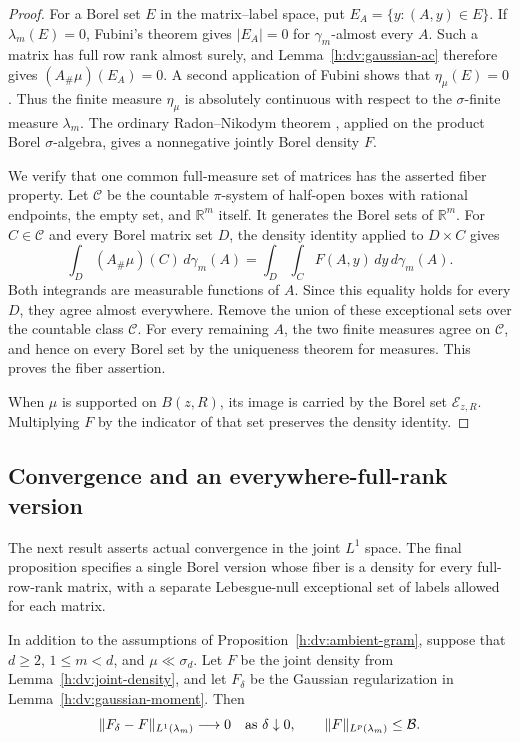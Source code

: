 \begin{proof}
For a Borel set \(E\) in the matrix--label space, put
\(E_A=\{y:(A,y)\in E\}\).  If \(\lambda_m(E)=0\), Fubini's theorem
gives \(|E_A|=0\) for \(\gamma_m\)-almost every \(A\).  Such a matrix
has full row rank almost surely, and Lemma~\ref{h:dv:gaussian-ac}
therefore gives \((A_\#\mu)(E_A)=0\).  A second application of Fubini
shows that \(\eta_\mu(E)=0\).  Thus the finite measure \(\eta_\mu\)
is absolutely continuous with respect to the \(\sigma\)-finite measure
\(\lambda_m\).  The ordinary Radon--Nikodym theorem
\cite[Theorem~6.27]{HunterMeasure2011}, applied on the product Borel
\(\sigma\)-algebra, gives a nonnegative jointly Borel density \(F\).

We verify that one common full-measure set of matrices has the asserted
fiber property.  Let \(\mathcal C\) be the countable \(\pi\)-system of
half-open boxes with rational endpoints, the empty set, and
\(\mathbb R^m\) itself.  It generates the Borel sets of
\(\mathbb R^m\).  For
\(C\in\mathcal C\) and every Borel matrix set \(D\), the density
identity applied to \(D\times C\) gives
\[
 \int_D(A_\#\mu)(C)\,d\gamma_m(A)
 =
 \int_D\int_C F(A,y)\,dy\,d\gamma_m(A).
\]
Both integrands are measurable functions of \(A\).  Since this equality
holds for every \(D\), they agree almost everywhere.  Remove the union
of these exceptional sets over the countable class \(\mathcal C\).
For every remaining \(A\), the two finite measures agree on
\(\mathcal C\), and hence on every Borel set by the uniqueness theorem
for measures.  This proves the fiber assertion.

When \(\mu\) is supported on \(B(z,R)\), its image is carried by
the Borel set \(\mathcal E_{z,R}\). Multiplying \(F\) by the indicator
of that set preserves the density identity.
\end{proof}

\subsection{Convergence and an everywhere-full-rank version}

The next result asserts actual convergence in the joint \(L^1\)
space. The final proposition specifies a single Borel version whose
fiber is a density for every full-row-rank matrix, with a separate
Lebesgue-null exceptional set of labels allowed for each matrix.

\begin{proposition}
\label{h:dv:joint-l1}
In addition to the assumptions of
Proposition~\ref{h:dv:ambient-gram}, suppose that \(d\ge2\),
\(1\le m<d\), and \(\mu\ll\sigma_d\).  Let \(F\) be the joint density
from Lemma~\ref{h:dv:joint-density}, and let \(F_\delta\) be the
Gaussian regularization in Lemma~\ref{h:dv:gaussian-moment}.  Then
\begin{equation}
 \|F_\delta-F\|_{L^1(\lambda_m)}\longrightarrow0
 \quad\hbox{as }\delta\downarrow0,
 \qquad
 \|F\|_{L^p(\lambda_m)}\le\mathcal B.
 \label{h:dv:joint-l1-bound}
\end{equation}
\end{proposition}

